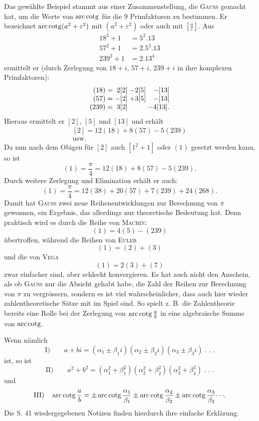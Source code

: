 Das gewählte Beispiel stammt aus einer Zusammenstellung, die \textsc{Gauss}
gemacht hat, um die Werte von $\operatorname{arc\,cotg}$ für die 9 Primfaktoren zu bestimmen.
Er bezeichnet $\operatorname{arc\,cotg}(a^2+\varepsilon^2)$ mit $(a^2+\varepsilon^2)$ oder auch mit $\left[\frac{a}{\varepsilon}\right]$. Aus
\[
\begin{aligned}
18^2+1&=5^2\mathord{.}13\\
57^2+1&=2\mathord{.}5^3\mathord{.}13\\
239^2+1&=2\mathord{.}13^4
\end{aligned}
\]
\noindent ermittelt er (durch Zerlegung von $18+i$, $57+i$, $239+i$ in ihre komplexen
Primfaktoren):
\[
\begin{array}{r@{\;}c@{\;}r@{\;}r@{\;}r}
(18)&=&2[2]&-2[5]&-[13]\\
(57)&=&-[2]&+3[5]&-[13]\\
(239)&=&3[2]&&-4[13].
\end{array}
\]
\noindent Hieraus ermittelt er $[2]$, $[5]$ und $[13]$ und erhält
\[
\begin{gathered}
[2]=12(18)+8(57)-5(239)\\
\text{usw.}
\end{gathered}
\]
\noindent Da nun nach dem Obigen für $[2]$ auch $[1^2+1]$ oder $(1)$ gesetzt werden kann,
so ist
\[
(1)=\frac{\pi}{4}=12(18)+8(57)-5(239).
\]
\noindent Durch weitere Zerlegung und Elimination erhält er auch:
\[
(1)=\frac{\pi}{4}=12(38)+20(57)+7(239)+24(268).
\]
\noindent Damit hat \textsc{Gauss} zwei neue Reihenentwicklungen zur Berechnung von $\pi$ gewonnen, ein Ergebnis, das allerdings nur theoretische Bedeutung hat. Denn
praktisch wird es durch die Reihe von \textsc{Machin}:
\[
(1)=4(5)-(239)
\]
\noindent übertroffen, während die Reihen von \textsc{Euler}
\[
(1)=(2)+(3)
\]
\noindent und die von \textsc{Vega}
\[
(1)=2(3)+(7)
\]
\noindent zwar einfacher sind, aber schlecht konvergieren.
\clearpage{}
\noindent\hspace*{\parindent}Es hat auch nicht den Anschein, als ob \textsc{Gauss} nur die Absicht gehabt
habe, die Zahl der Reihen zur Berechnung von $\pi$ zu vergrössern, sondern es
ist viel wahrscheinlicher, dass auch hier wieder zahlentheoretische Sätze mit
im Spiel sind. So spielt z. B. die Zahlentheorie bereits eine Rolle bei der
Zerlegung von $\operatorname{arc\,cotg}\frac{a}{b}$ in eine algebraische Summe von $\operatorname{arc\,cotg}$.

Wenn nämlich
\[
\text{I)}\qquad a+bi=(\alpha_1\pm\beta_1i)(\alpha_2\pm\beta_2i)(\alpha_3\pm\beta_3i)\;\mathord{.}\;\mathord{.}\;\mathord{.}
\]
\noindent ist, so ist
\[
\text{II)}\qquad a^2+b^2=(\alpha_1^2+\beta_1^2)(\alpha_2^2+\beta_2^2)(\alpha_3^2+\beta_3^3)\;\mathord{.}\;\mathord{.}\;\mathord{.}
\]
\noindent und
\[
\text{III)}\quad \operatorname{arc\,cotg}\frac{a}{b}=\pm\operatorname{arc\,cotg}\frac{\alpha_1}{\beta_1}\pm\operatorname{arc\,cotg}\frac{\alpha_2}{\beta_2}\pm\operatorname{arc\,cotg}\frac{\alpha_3}{\beta_3}\mathord{\cdots}.
\]
\noindent Die S. 41 wiedergegebenen Notizen finden hierdurch ihre einfache Erklärung.


